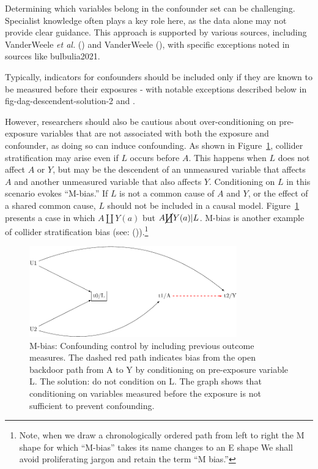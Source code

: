 \documentclass[
  singlecolumn,
  9pt]{article}
\begin{document}
Determining which variables belong in the confounder set can be
challenging. Specialist knowledge often plays a key role here, as the
data alone may not provide clear guidance. This approach is supported by
various sources, including VanderWeele \emph{et al.}
() and VanderWeele
(), with specific exceptions noted
in sources like bulbulia2021.

Typically, indicators for confounders should be included only if they
are known to be measured before their exposures - with notable
exceptions described below in fig-dag-descendent-solution-2 and .

However, researchers should also be cautious about over-conditioning on
pre-exposure variables that are not associated with both the exposure
and confounder, as doing so can induce confounding. As shown in
Figure~\ref{fig-m-bias}, collider stratification may arise even if \(L\)
occurs before \(A\). This happens when \(L\) does not affect \(A\) or
\(Y\), but may be the descendent of an unmeasured variable that affects
\(A\) and another unmeasured variable that also affects \(Y\).
Conditioning on \(L\) in this scenario evokes ``M-bias.'' If \(L\) is
not a common cause of \(A\) and \(Y\), or the effect of a shared common
cause, \(L\) should not be included in a causal model.
Figure~\ref{fig-m-bias} presents a case in which \(A \coprod Y(a)\) but
\(A \cancel{\coprod} Y(a)| L\). M-bias is another example of collider
stratification bias (see: ()).\footnote{Note, when we draw a chronologically ordered path from
  left to right the M shape for which ``M-bias'' takes its name changes
  to an E shape We shall avoid proliferating jargon and retain the term
  ``M bias.''}

\begin{figure}

{\centering \includegraphics[width=0.8\textwidth,height=\textheight]{causal-dags_files/figure-pdf/fig-m-bias-1.pdf}

}

\caption{\label{fig-m-bias}M-bias: Confounding control by including
previous outcome measures. The dashed red path indicates bias from the
open backdoor path from A to Y by conditioning on pre-exposure variable
L. The solution: do not condition on L. The graph shows that
conditioning on variables measured before the exposure is not sufficient
to prevent confounding.}

\end{figure}
\end{document}
